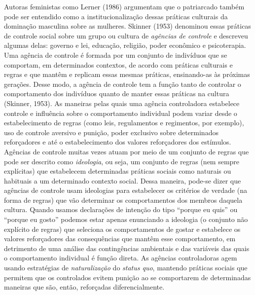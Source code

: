 Autoras feministas como Lerner (1986) argumentam que o patriarcado também pode ser entendido como a institucionalização dessas práticas culturais da dominação masculina sobre as mulheres. Skinner (1953) denominou essas práticas de controle social sobre um grupo ou cultura de \textit{agências de controle} e descreveu algumas delas: governo e lei, educação, religião, poder econômico e psicoterapia. Uma agência de controle é formada por um conjunto de indivíduos que se comportam, em determinados contextos, de acordo com práticas culturais e regras e que mantêm e replicam essas mesmas práticas, ensinando-as às próximas gerações. Desse modo, a agência de controle tem a função tanto de controlar o comportamento dos indivíduos quanto de manter essas práticas na cultura (Skinner, 1953). As maneiras pelas quais uma agência controladora estabelece controle e influência sobre o comportamento individual podem variar desde o estabelecimento de regras (como leis, regulamentos e regimentos, por exemplo), uso de controle aversivo e punição, poder exclusivo sobre determinados reforçadores e até o estabelecimento dos valores reforçadores dos estímulos. Agências de controle muitas vezes atuam por meio de um conjunto de regras que pode ser descrito como \textit{ideologia}, ou seja, um conjunto de regras (nem sempre explícitas) que estabelecem determinadas práticas sociais como naturais ou habituais a um determinado contexto social. Dessa maneira, pode-se dizer que agências de controle usam ideologias para estabelecer os critérios de verdade (na forma de regras) que vão determinar os comportamentos dos membros daquela cultura. Quando usamos declarações de intenção do tipo ``porque eu quis'' ou ``porque eu gosto'' podemos estar apenas enunciando a ideologia (o conjunto não explícito de regras) que seleciona os comportamentos de gostar e estabelece os valores reforçadores das consequências que mantêm esse comportamento, em detrimento de uma análise das contingências ambientais e das variáveis das quais o comportamento individual é função direta. As agências controladoras agem usando estratégias de \textit{naturalização} do \textit{status quo}, mantendo práticas sociais que permitem que os controlados evitem punição ao se comportarem de determinadas maneiras que são, então, reforçadas diferencialmente. 

